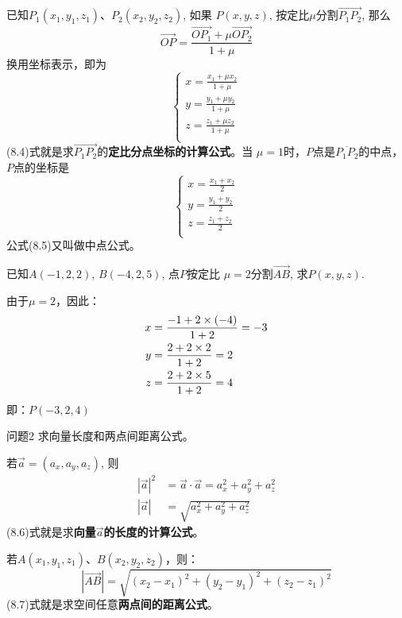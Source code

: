 已知$P_1(x_1,y_1,z_1)$、$P_2(x_2,y_2,z_2)$, 如果
$P(x,y,z)$, 按定比$\mu$分割$\Vec{P_1P_2}$, 那么
\[\Vec{OP}=\frac{\Vec{OP_1}+\mu \Vec{OP_2}}{1+\mu}\]
换用坐标表示，即为
\begin{equation}
    \begin{cases}
        x=\frac{x_1+\mu x_2}{1+\mu}\\
        y=\frac{y_1+\mu y_2}{1+\mu}\\
        z=\frac{z_1+\mu z_2}{1+\mu}\\
    \end{cases}
\end{equation}
(8.4)式就是求$\Vec{P_1P_2}$的\textbf{定比分点坐标的计算公式}。当
$\mu=1$时，$P$点是$\overline{P_1P_2}$的中点，$P$点的坐标是
\begin{equation}
    \begin{cases}
        x=\frac{x_1+ x_2}{2}\\
        y=\frac{y_1+ y_2}{2}\\
        z=\frac{z_1+ z_2}{2}\\
    \end{cases}
\end{equation}
公式(8.5)又叫做中点公式。


\begin{example}
已知$A(-1,2,2)$, $B(-4,2,5)$, 点$P$按定比
$\mu=2$分割$\Vec{AB}$, 求$P(x,y,z)$.
\end{example}

\begin{solution}
由于$\mu=2$，因此：
\[\begin{split}
    x&=\dfrac{-1+2\times (-4)}{1+2}=-3\\
    y&=\dfrac{2+2\times 2}{1+2}=2\\
    z&=\dfrac{2+2\times 5}{1+2}=4\\
\end{split}\]    
即：$P(-3,2,4)$
\end{solution}

\begin{blk}{问题2}
    求向量长度和两点间距离公式。
\end{blk}

若$\vec{a}=(a_x,a_y,a_z)$, 则
\begin{align}
    |\vec{a}|^2&=\vec{a}\cdot \vec{a} =a^2_x+a^2_y+a^2_z\nonumber\\
|\vec{a}|&=\sqrt{a^2_x+a^2_y+a^2_z}
\end{align}
(8.6)式就是求\textbf{向量$\vec{a}$的长度的计算公式}。

若$A(x_1,y_1,z_1)$、$B(x_2,y_2,z_2)$，则：
\begin{equation}
   |\Vec{AB}|=\sqrt{(x_2-x_1)^2+(y_2-y_1)^2+(z_2-z_1)^2} 
\end{equation}
(8.7)式就是求空间任意\textbf{两点间的距离公式}。


